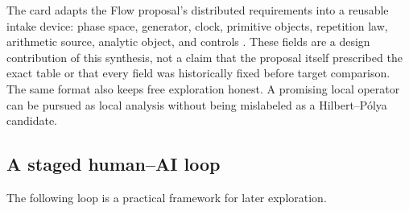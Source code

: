 The card adapts the Flow proposal's distributed requirements into a reusable intake device: phase space, generator, clock, primitive objects, repetition law, arithmetic source, analytic object, and controls . These fields are a design contribution of this synthesis, not a claim that the proposal itself prescribed the exact table or that every field was historically fixed before target comparison. The same format also keeps free exploration honest. A promising local operator can be pursued as local analysis without being mislabeled as a Hilbert--Pólya candidate.

\hypertarget{a-staged-humanai-loop}{%
\subsection{A staged human--AI loop}\label{a-staged-humanai-loop}}

The following loop is a practical framework for later exploration.

